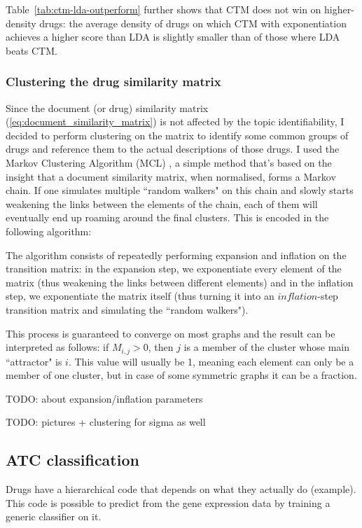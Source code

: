 \documentclass[12pt,a4paper,twoside,openright]{report}
\begin{document}
Table~\ref{tab:ctm-lda-outperform} further shows that CTM does not win on higher-density drugs: the average density of drugs on which CTM with exponentiation achieves a higher score than LDA is slightly smaller than of those where LDA beats CTM.

\subsubsection{Clustering the drug similarity matrix}
Since the document (or drug) similarity matrix (\ref{eq:document_similarity_matrix}) is not affected by the topic identifiability, I decided to perform clustering on the matrix to identify some common groups of drugs and reference them to the actual descriptions of those drugs.
I used the Markov Clustering Algorithm (MCL)  \cite{Dongen:2000:CAG:868986}, a simple method that's based on the insight that a document similarity matrix, when normalised, forms a Markov chain. If one simulates multiple ``random walkers" on this chain and slowly starts weakening the links between the elements of the chain, each of them will eventually end up roaming around the final clusters. This is encoded in the following algorithm:



The algorithm consists of repeatedly performing expansion and inflation on the transition matrix: in the expansion step, we exponentiate every element of the matrix (thus weakening the links between different elements) and in the inflation step, we exponentiate the matrix itself (thus turning it into an $\mathit{inflation}$-step transition matrix and simulating the ``random walkers").

This process is guaranteed to converge on most graphs and the result can be interpreted as follows: if $M_{i,j} > 0$, then $j$ is a member of the cluster whose main ``attractor" is $i$. This value will usually be 1, meaning each element can only be a member of one cluster, but in case of some symmetric graphs it can be a fraction.

TODO: about expansion/inflation parameters

TODO: pictures + clustering for sigma as well

\subsection{ATC classification}

Drugs have a hierarchical code that depends on what they actually do (example). This code is possible to predict from the gene expression data by training a generic classifier on it.
\end{document}
